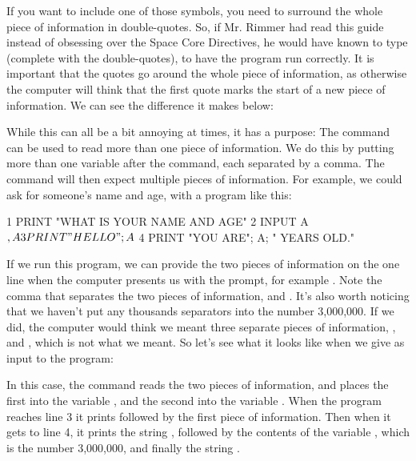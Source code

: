 \needspace{4cm}
If you want to include one of those symbols, you need to surround the
whole piece of information in double-quotes.  So, if Mr. Rimmer had
read this guide instead of obsessing over the Space Core Directives,
he would have known to type  (complete with the
double-quotes), to have the program
  run correctly.  It is important that the quotes go around the whole
  piece of information, as otherwise the computer will think that the
  first quote marks the start of a new piece of information.  We can
  see the difference it makes below:


\needspace{1.5cm}
While this can all be a bit annoying at times, it has a purpose: The
 command can be used to read more than one piece of
information.  We do this by putting more than one variable after the
 command, each separated by a comma.  The 
command will then expect multiple pieces of information.  For example,
we could ask for someone's name and age, with a program like this:

\begin{screencode}
  1 PRINT "WHAT IS YOUR NAME AND AGE"
  2 INPUT A$, A
  3 PRINT "HELLO "; A$
  4 PRINT "YOU ARE"; A; " YEARS OLD."
\end{screencode}

\needspace{4cm}
If we run this program, we can provide the two pieces of information
on the one line when the computer presents us with the  prompt,
for example . Note the comma that separates the
two pieces of information,  and .  It's also
worth noticing that we haven't put any thousands separators into the
number 3,000,000.  If we did, the computer would think we meant three
separate pieces of information, ,  and ,
which is not what we meant.  So let's see what it looks like when we
give  as input to the program:


  In this case, the 
   command reads the two pieces of
information, and places the first into the variable , and the second
into the variable . When the program reaches line 3 it prints
 followed by the first piece of information.
Then when it gets to line 4, it prints the string ,
followed by the contents of the variable , which is the number
3,000,000, and finally the string .

